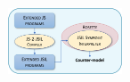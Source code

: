 \documentclass[sigconf, review]{acmart}
\newcommand{\jsil}{JSIL\xspace}
\newcommand{\JSComp}{JS-2-JSIL\xspace}
\newcommand{\cosette}{Cosette\xspace}
\begin{document}




 



%
%
%
%
%
%

\begin{figure}
\vspace*{-0.4cm}
\hspace*{-0.67cm}
\centering
\includegraphics[width=0.27\textwidth]{figures/jilette_blue.png}
\vspace*{-0.55cm}
\label{fig:jilette:diagram}
\end{figure}
 
\end{document}
